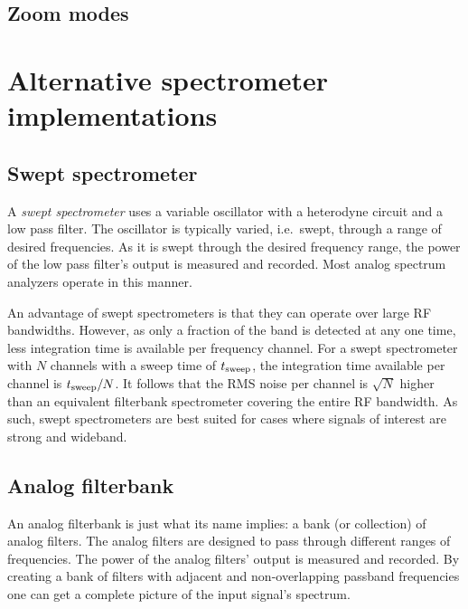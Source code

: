 \documentclass{ws-rv961x669}
\begin{document}
\subsection{Zoom modes}

\section{Alternative spectrometer implementations}

\subsection{Swept spectrometer}\label{swept-spectrometer}


A \emph{swept spectrometer} uses a variable oscillator with a heterodyne
circuit and a low pass filter. The oscillator is typically varied, i.e.~swept, through a range of desired frequencies. As it is swept through the desired frequency range, the power of the low pass filter's output is measured and recorded. Most analog spectrum analyzers operate in this manner.

An advantage of swept spectrometers is that they can operate over large RF bandwidths. However, as only a fraction of the band is detected at any one time, less integration time is available per frequency channel. For a swept spectrometer with $N$ channels with a sweep time of $t_{\rm{sweep}}$, the integration time available per channel is $t_{\rm{sweep}}/N$. It follows that  the RMS noise per channel is $\sqrt{N}$ higher than an equivalent filterbank spectrometer covering the entire RF bandwidth. As such, swept spectrometers are best suited for cases where signals of interest are strong and wideband. 

\subsection{Analog filterbank}\label{analog-filter-bank}

An analog filterbank is just what its name implies: a bank (or collection) of analog filters. The analog filters are designed to pass through different ranges of frequencies. The power of the analog filters' output is measured and recorded. By creating a bank of filters with adjacent and non-overlapping passband frequencies one can get a complete picture of the input signal's spectrum.
\end{document}
